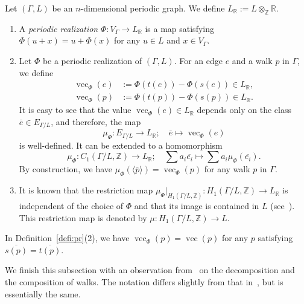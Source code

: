 \documentclass[11pt]{article}
\theoremstyle{definition}
\numberwithin{equation}{section}
\begin{document}
\begin{defn}\label{defi:pr}
Let $(\Gamma,L)$ be an $n$-dimensional periodic graph.
We define $L_{\mathbb{R}} := L \otimes _{\mathbb{Z}} \mathbb{R}$. 
\begin{enumerate}
\item 
A \textit{periodic realization} $\Phi: V_{\Gamma} \to L_{\mathbb{R}}$ is a map satisfying
$\Phi(u+x) = u + \Phi(x)$ for any $u \in L$ and $x \in V _{\Gamma}$. 

\item 
Let $\Phi$ be a periodic realization of $(\Gamma, L)$. 
For an edge $e$ and a walk $p$ in $\Gamma$, we define 
\begin{align*}
\operatorname{vec}_{\Phi}(e) &:= \Phi(t(e)) - \Phi(s(e)) \in L_{\mathbb{R}}, \\
\operatorname{vec}_{\Phi}(p) &:= \Phi(t(p)) - \Phi(s(p)) \in L_{\mathbb{R}}. 
\end{align*}
It is easy to see that the value $\operatorname{vec}_{\Phi}(e) \in L_{\mathbb{R}}$ depends only on the class $\overline{e} \in E_{\Gamma /L}$, 
and therefore, 
the map 
\[
\mu _{\Phi} : E_{\Gamma /L} \to L_{\mathbb{R}};\quad \overline{e} \mapsto \operatorname{vec}_{\Phi}(e)
\]
is well-defined. 
It can be extended to a homomorphism 
\[
\mu _{\Phi}: C_1(\Gamma/L, \mathbb{Z}) \to L_{\mathbb{R}}; \quad 
\sum a_i \overline{e_i} \mapsto \sum a_i \mu _{\Phi} (\overline{e_i}). 
\]
By construction, we have $\mu _{\Phi} (\langle \overline{p} \rangle) = \operatorname{vec}_{\Phi}(p)$ for any walk $p$ in $\Gamma$. 

\item 
It is known that the restriction map $\mu _{\Phi} |_{H_1(\Gamma/L, \mathbb{Z})}: H_1(\Gamma/L, \mathbb{Z}) \to L_{\mathbb{R}}$ is independent of the choice of $\Phi$ and that its image is contained in $L$ (see~\cite[Lemma 2.7]{IN}). 
This restriction map is denoted by $\mu : H_1(\Gamma/L, \mathbb{Z}) \to L$. 
\end{enumerate}
\end{defn}

\begin{rmk}\label{rmk:finmap}
In Definition~\ref{defi:pr}(2), we have $\operatorname{vec}_{\Phi}(p) = \operatorname{vec}(p)$
for any $p$ satisfying $\overline{s(p)} = \overline{t(p)}$. 
\end{rmk}




We finish this subsection with an observation from~\cite{IN} on the decomposition and the composition of walks.
The notation differs slightly from that in~\cite{IN}, but is essentially the same.
\end{document}
